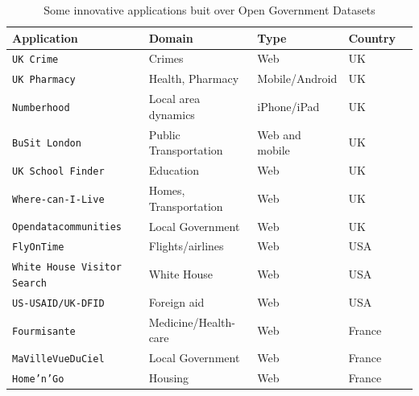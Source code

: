 \begin{table}[ht!b]
    \caption{Some innovative applications buit over Open Government Datasets} \label{tab:apps-survey}
    \small
    \center
   \begin{tabularx}{\textwidth}{@{}llllX@{}}
    \toprule
    \textbf{Application} & \textbf{Domain} & \textbf{Type} &  \textbf{Country}  \\
    \toprule
    \texttt{UK Crime} &	Crimes & Web & UK  \\
    \midrule
\texttt{UK Pharmacy} & Health, Pharmacy  & Mobile/Android  & UK \\
	\midrule
	\texttt{Numberhood} & Local area dynamics  & iPhone/iPad & UK \\
	
	\midrule
	\texttt{BuSit London} & Public Transportation  & Web and mobile  & UK \\
	
	\midrule
	\texttt{UK School Finder} & Education  & Web  & UK \\
	
	\midrule
	\texttt{Where-can-I-Live} & Homes, Transportation & Web  & UK \\
	\midrule
	
	\texttt{Opendatacommunities} & Local Government & Web  & UK \\
	\midrule
	
	\texttt{FlyOnTime } & Flights/airlines & Web  & USA \\
	\midrule
	
	\texttt{White House Visitor Search} & White House & Web  & USA \\
	\midrule
	
	\texttt{US-USAID/UK-DFID} & Foreign aid & Web  & USA \\
	\midrule
	
	\texttt{Fourmisante} & Medicine/Health-care & Web  & France \\
	\midrule
	
	\texttt{MaVilleVueDuCiel} & Local Government  & Web & France \\
	\midrule
	
	\texttt{Home'n'Go } & Housing & Web & France \\
	
	
    \bottomrule

    \end{tabularx}
    \end{table}

